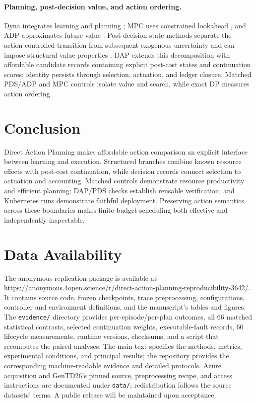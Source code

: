 \documentclass[acmsmall,screen,review,anonymous]{acmart}
\begin{document}
\paragraph{Planning, post-decision value, and action ordering.}
Dyna integrates learning and planning \cite{sutton1991dyna}; MPC uses constrained
lookahead \cite{mesbah2016smpc}, and ADP approximates future value
\cite{powell2011adp}. Post-decision-state methods separate the action-controlled
transition from subsequent exogenous uncertainty and can impose structural
value properties \cite{jiang2015monotoneadp,bhat2026pds}. DAP extends this
decomposition with affordable candidate records containing explicit post-cost
states and continuation scores; identity persists through selection, actuation,
and ledger closure. Matched PDS/ADP and MPC controls
isolate value and search, while exact DP measures action ordering.

\section{Conclusion}

Direct Action Planning makes affordable action comparison an explicit
interface between learning and execution. Structured branches combine known
resource effects with post-cost continuation, while decision records connect
selection to actuation and accounting. Matched controls demonstrate resource
productivity and efficient planning; DAP/PDS checks establish reusable
verification; and Kubernetes runs demonstrate faithful deployment. Preserving
action semantics across these boundaries makes finite-budget scheduling both
effective and independently inspectable.

\clearpage
\section{Data Availability}

\begin{sloppypar}
The anonymous replication package is available at
\url{https://anonymous.4open.science/r/direct-action-planning-reproducibility-3642/}.
It contains source code, frozen checkpoints, trace preprocessing, configurations, controller
and environment definitions, and the manuscript's tables and figures. The
\texttt{evidence/} directory provides per-episode/per-plan outcomes, all 66
matched statistical contrasts, selected continuation weights, executable-fault
records, 60 lifecycle measurements, runtime versions, checksums, and a script
that recomputes the paired analyses. The main text specifies the methods,
metrics, experimental conditions, and principal results; the repository
provides the corresponding machine-readable evidence and detailed protocols.
Azure acquisition and GenTD26's pinned source, preprocessing recipe, and access
instructions are documented under \texttt{data/}; redistribution follows the
source datasets' terms. A public release will be maintained upon acceptance.
\end{sloppypar}



\end{document}
